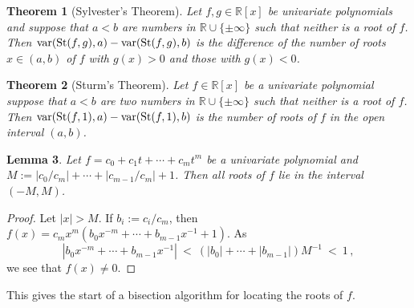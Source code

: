 \documentclass[12pt]{amsart}
\numberwithin{equation}{section}
\newtheorem{theorem}{Theorem}[section]
\newtheorem{lemma}[theorem]{Lemma}
\theoremstyle{remark}
\newcommand{\RR}{{\mathbb R}}
\DeclareMathOperator{\var}{{\rm var}}
\DeclareMathOperator{\St}{{\rm St}}
\begin{document}
\begin{theorem}[Sylvester's Theorem]
Let $f,g\in\RR[x]$ be univariate polynomials and suppose that $a<b$ are numbers in  $\RR\cup\{\pm\infty\}$
such that neither is a root of $f$.
Then $\var(\St(f,g),a)-\var(\St(f,g),b)$ is the difference of the number of roots $x\in(a,b)$ of $f$ with $g(x)>0$
and those with $g(x)<0$.
\end{theorem}


\begin{theorem}[Sturm's Theorem]
Let $f\in\RR[x]$ be a univariate polynomial suppose that $a<b$ are two numbers in  $\RR\cup\{\pm\infty\}$
such that neither is a root of $f$.
Then $\var(\St(f,1),a)-\var(\St(f,1),b)$ is the number of roots of $f$ in the open interval $(a,b)$.
\end{theorem}

\begin{lemma}
Let $f=c_0+c_1t+\dotsb+c_m t^m$ be a univariate polynomial and $M:=|c_0/c_m|+\dotsb+|c_{m-1}/c_m|+1$.
Then all roots of $f$ lie in the interval $(-M,M)$.
\end{lemma}
\begin{proof}
Let $|x|>M$.
If $b_i:=c_i/c_m$, then $f(x)=c_m x^m(b_0 x^{-m}+\dotsb+b_{m-1}x^{-1} +1)$.
As
\[
   |b_0 x^{-m}+\dotsb+b_{m-1} x^{-1}|\ <\
   (|b_0|+\dotsb+|b_{m-1}|)M^{-1}\ <\ 1\,,
\]
we see that $f(x)\neq 0$.
\end{proof}

This gives the start of a bisection algorithm for locating the roots of $f$.



   
    
    





\end{document}
